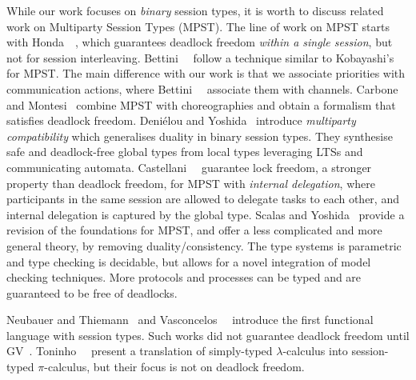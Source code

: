 \documentclass[main.tex]{subfiles}
\begin{document}
While our work focuses on \emph{binary} session types, it is worth to discuss related work on Multiparty Session Types (MPST). The line of work on MPST starts with Honda~\etal~\cite{hondayoshida08}, which guarantees deadlock freedom \emph{within a single session}, but not for session interleaving.
Bettini~\etal~\cite{bettinicoppo08} follow a technique similar to Kobayashi's for MPST.
The main difference with our work is that we associate priorities with communication actions, where Bettini~\etal~\cite{bettinicoppo08} associate them with channels.
Carbone and Montesi~\cite{carbonemontesi13} combine MPST with choreographies and obtain a formalism that satisfies deadlock freedom.
Deni\'{e}lou and Yoshida~\cite{DenielouY13} introduce \emph{multiparty compatibility} which generalises duality in binary session types. They synthesise safe and deadlock-free global types from local types leveraging LTSs and communicating automata.
Castellani~\etal~\cite{CastellaniDGH20} guarantee lock freedom, a stronger property than deadlock freedom, for MPST with \emph{internal delegation}, where participants in the same session are allowed to delegate tasks to each other, and internal delegation is captured by the global type.
Scalas and Yoshida~\cite{scalasyoshida19} provide a revision of the foundations for MPST, and offer a less complicated and more general theory, by removing duality/consistency. The type systems is parametric and type checking is decidable, but allows for a novel integration of model checking techniques. More protocols and processes can be typed and are guaranteed to be free of deadlocks.

Neubauer and Thiemann~\cite{neubauert04} and Vasconcelos~\etal~\cite{vasconcelosravara04,vasconcelosgay06} introduce the first functional language with session types. Such works did not guarantee deadlock freedom until GV~\cite{lindleymorris15,wadler14}.
Toninho~\etal~\cite{toninhocaires12} present a translation of simply-typed $\lambda$-calculus into session-typed $\pi$-calculus, but their focus is not on deadlock freedom.
\end{document}
